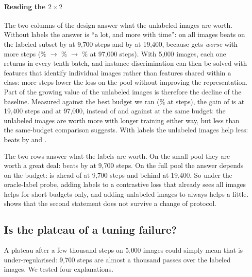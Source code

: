 \paragraph{Reading the $2\times2$}
The two columns of the design answer what the unlabeled images are worth. Without labels the answer is
``a lot, and more with time'': \simclr on all images beats \simclr on the labeled subset by
\pt at 9,700 steps and by \pt at 19,400,
because \simclrsub gets \emph{worse} with more steps (\% $\to$
\% $\to$ \% at 97,000 steps). With 5,000 images, each one returns in every tenth batch, and instance
discrimination can then be solved with features that identify individual images rather than features shared
within a class: more steps lower the loss on the pool without improving the representation. Part of the
growing value of the unlabeled images is therefore the decline of the baseline. Measured against the best
\simclrsub budget we ran (\% at  steps), the gain of \simclr is
\pt at 19,400 steps and \pt at 97,000, instead of
 and \pt against \simclrsub at the same budget:
the unlabeled images are worth more with longer training either way, but less than the same-budget
comparison suggests. With labels the unlabeled
images help less: \union beats \supcon by \pt and
\pt.

The two rows answer what the labels are worth. On the small pool they are worth a great deal: \supcon beats
\simclrsub by \pt at 9,700 steps. On the full pool the answer depends on the
budget: \union is \pt ahead of \simclr at 9,700 steps and
\pt behind at 19,400. So under the oracle-label probe, adding labels to a
contrastive loss that already sees all images helps for short budgets only, and adding unlabeled images to
\supcon always helps a little.  shows that the second statement does not survive a change
of protocol.

\subsection{Is the plateau of \supcon a tuning failure?}
\label{sec:plateau}
A plateau after a few thousand steps on 5,000 images could simply mean that \supcon is under-regularised:
9,700 steps are almost a thousand passes over the labeled images. We tested four explanations.

